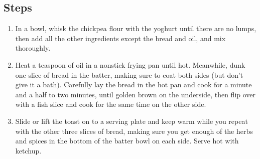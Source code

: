 \documentclass{book}
\begin{document}
\subsection*{Steps}
\begin{enumerate}
\item In a bowl, whisk the chickpea flour with the yoghurt until there are no lumps, then add all the other ingredients except the bread and oil, and mix thoroughly.
\item Heat a teaspoon of oil in a nonstick frying pan until hot. Meanwhile, dunk one slice of bread in the batter, making sure to coat both sides (but don’t give it a bath). Carefully lay the bread in the hot pan and cook for a minute and a half to two minutes, until golden brown on the underside, then flip over with a fish slice and cook for the same time on the other side.
\item Slide or lift the toast on to a serving plate and keep warm while you repeat with the other three slices of bread, making sure you get enough of the herbs and spices in the bottom of the batter bowl on each side. Serve hot with ketchup.
\end{enumerate}
\newpage
\end{document}
